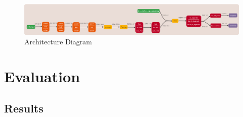 \documentclass{mpaper}
\begin{document}
\begin{figure}[h!]
    \centering
    \includegraphics[width=1\textwidth]{diagrams/model_architecture.png}
    \caption{Architecture Diagram}
    \label{fig:model_architecture}
\end{figure}


\section{Evaluation}

\subsection{Results}
    
\end{document}
